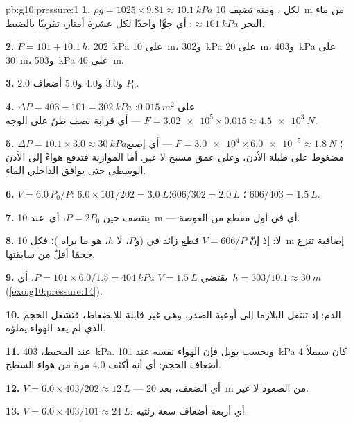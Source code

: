 \begin{solution}{pb:g10:pressure:1}
\textbf{1.} $\rho g = 1025 \times 9.81 \approx \qty{10.1}{kPa}$ لكل
، ومنه تضيف \qty{10}{m} من ماء البحر $\approx \qty{101}{kPa}$: أي جوًّا
واحدًا لكل عشرة أمتار، تقريبًا بالضبط.

\textbf{2.} $P = 101 + 10.1\,h$: \qty{202}{kPa} على \qty{10}{m}،
و\qty{302}{kPa} على \qty{20}{m}، و\qty{403}{kPa} على \qty{30}{m}،
و\qty{503}{kPa} على \qty{40}{m}.

\textbf{3.} $2.0$ و$3.0$ و$4.0$ و$5.0$ أضعاف $P_0$.

\textbf{4.} $\Delta P = 403 - 101 = \qty{302}{kPa}$ على
$\qty{0.015}{m^2}$: $F = \num{3.02e5} \times 0.015 \approx
\qty{4.5e3}{N}$ --- أي  قرابة نصف طنّ على الوجه.

\textbf{5.} $\Delta P = 10.1 \times 3.0 \approx \qty{30}{kPa}$؛
$F = \num{3.0e4} \times \num{6.0e-5} \approx \qty{1.8}{N}$ --- أي إصبع
مضغوط على طبلة الأذن، وعلى عمق مسبح لا غير. أما الموازنة فتدفع
هواءً إلى الأذن الوسطى حتى يوافق  الداخلي  الماء.

\textbf{6.} $V = 6.0 \, P_0/P$: $6.0 \times 101/202 = \qty{3.0}{L}$؛
$606/302 = \qty{2.0}{L}$؛ $606/403 = \qty{1.5}{L}$.

\textbf{7.} ينتصف حين $P = 2P_0$، أي\ عند \qty{10}{m} --- أي في
أول مقطع من الغوصة.

\textbf{8.} لا: إذ إنّ $V = 606/P$ قطع زائد في 
(و$P$، لا $h$، هو ما يراه )؛ فكل
\qty{10}{m} إضافية تنزع حجمًا أقلّ من سابقتها.

\textbf{9.} يقتضي $V = \qty{1.5}{L}$
$P = 101 \times 6.0/1.5 = \qty{404}{kPa}$، أي\
$h = 303/10.1 \approx \qty{30}{m}$ (\cref{exo:g10:pressure:14}).

\textbf{10.} الدم: إذ تنتقل البلازما إلى أوعية الصدر،
وهي غير قابلة للانضغاط، فتشغل الحجم الذي لم يعد الهواء يملؤه.

\textbf{11.} عند  المحيط، \qty{403}{kPa}. وبحسب بويل فإن الهواء نفسه
عند \qty{101}{kPa} كان سيملأ $4$ أضعاف الحجم: أي أنه أكثف $4.0$
مرة من هواء السطح.

\textbf{12.} $V = 6.0 \times 403/202 \approx \qty{12}{L}$ --- أي الضعف،
بعد \qty{20}{m} من الصعود لا غير.

\textbf{13.} $V = 6.0 \times 403/101 \approx \qty{24}{L}$: أي أربعة أضعاف
سعة رئتيه.


\end{solution}

